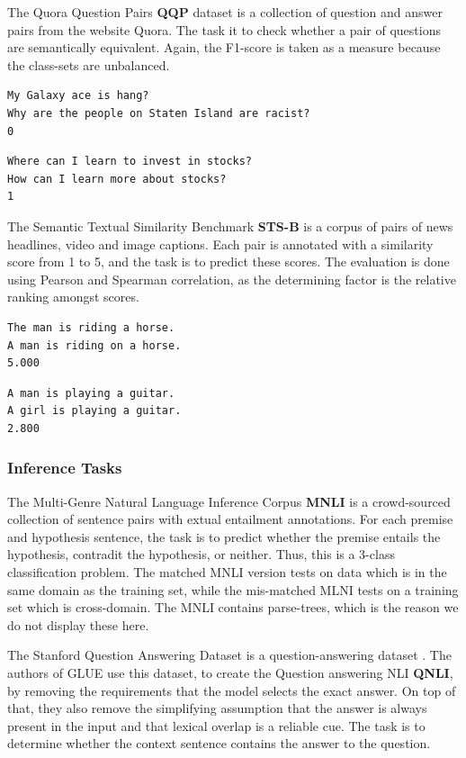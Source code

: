 \documentclass[a4paper,12pt,twoside,openright]{report}
\begin{document}
The Quora Question Pairs \textbf{QQP} \cite{shankar17} dataset is a collection of question and answer pairs from the website Quora. 
The task it to check whether a pair of questions are semantically equivalent.
Again, the F1-score is taken as a measure because the class-sets are unbalanced.


\begin{verbatim}
My Galaxy ace is hang?	
Why are the people on Staten Island are racist?	
0
\end{verbatim}

\begin{verbatim}
Where can I learn to invest in stocks?	
How can I learn more about stocks?	
1
\end{verbatim}

The Semantic Textual Similarity Benchmark \textbf{STS-B} \cite{cer2017} is a corpus of pairs of news headlines, video and image captions.
Each pair is annotated with a similarity score from 1 to 5, and the task is to predict these scores.
The evaluation is done using Pearson and Spearman correlation, as the determining factor is the relative ranking amongst scores.


\begin{verbatim}
The man is riding a horse.	
A man is riding on a horse.	
5.000
\end{verbatim}

\begin{verbatim}
A man is playing a guitar.
A girl is playing a guitar.	
2.800
\end{verbatim}

\subsubsection{Inference Tasks}

The Multi-Genre Natural Language Inference Corpus \textbf{MNLI} \cite{N18-1101} \cite{bowman2015} is a crowd-sourced collection of sentence pairs with extual entailment annotations.
For each premise and hypothesis sentence, the task is to predict whether the premise entails the hypothesis, contradit the hypothesis, or neither.
Thus, this is a 3-class classification problem.
The matched MNLI version tests on data which is in the same domain as the training set, while the mis-matched MLNI tests on a training set which is cross-domain.
The MNLI contains parse-trees, which is the reason we do not display these here.

The Stanford Question Answering Dataset is a question-answering dataset \cite{rajpurkar2016}. 
The authors of GLUE use this dataset, to create the Question answering NLI \textbf{QNLI}, by removing the requirements that the model selects the exact answer.
On top of that, they also remove the simplifying assumption that the answer is always present in the input and that lexical overlap is a reliable cue.
The task is to determine whether the context sentence contains the answer to the question. 
\end{document}
